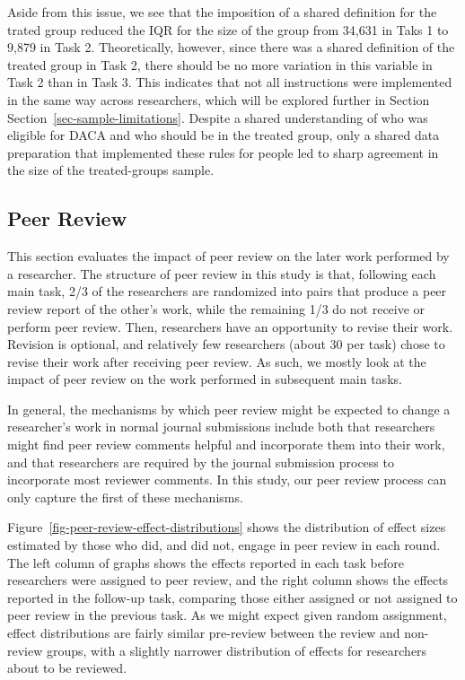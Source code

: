 \documentclass[
  letterpaper,
  DIV=11,
  numbers=noendperiod]{scrartcl}
\begin{document}
Aside from this issue, we see that the imposition of a shared definition
for the trated group reduced the IQR for the size of the group from
34,631 in Taks 1 to 9,879 in Task 2. Theoretically, however, since there
was a shared definition of the treated group in Task 2, there should be
no more variation in this variable in Task 2 than in Task 3. This
indicates that not all instructions were implemented in the same way
across researchers, which will be explored further in Section
Section~\ref{sec-sample-limitations}. Despite a shared understanding of
who was eligible for DACA and who should be in the treated group, only a
shared data preparation that implemented these rules for people led to
sharp agreement in the size of the treated-groups sample.

\hypertarget{peer-review}{%
\subsection{Peer Review}\label{peer-review}}

This section evaluates the impact of peer review on the later work
performed by a researcher. The structure of peer review in this study is
that, following each main task, 2/3 of the researchers are randomized
into pairs that produce a peer review report of the other's work, while
the remaining 1/3 do not receive or perform peer review. Then,
researchers have an opportunity to revise their work. Revision is
optional, and relatively few researchers (about 30 per task) chose to
revise their work after receiving peer review. As such, we mostly look
at the impact of peer review on the work performed in subsequent main
tasks.

In general, the mechanisms by which peer review might be expected to
change a researcher's work in normal journal submissions include both
that researchers might find peer review comments helpful and incorporate
them into their work, and that researchers are required by the journal
submission process to incorporate most reviewer comments. In this study,
our peer review process can only capture the first of these mechanisms.

Figure~\ref{fig-peer-review-effect-distributions} shows the distribution
of effect sizes estimated by those who did, and did not, engage in peer
review in each round. The left column of graphs shows the effects
reported in each task before researchers were assigned to peer review,
and the right column shows the effects reported in the follow-up task,
comparing those either assigned or not assigned to peer review in the
previous task. As we might expect given random assignment, effect
distributions are fairly similar pre-review between the review and
non-review groups, with a slightly narrower distribution of effects for
researchers about to be reviewed.
\end{document}
